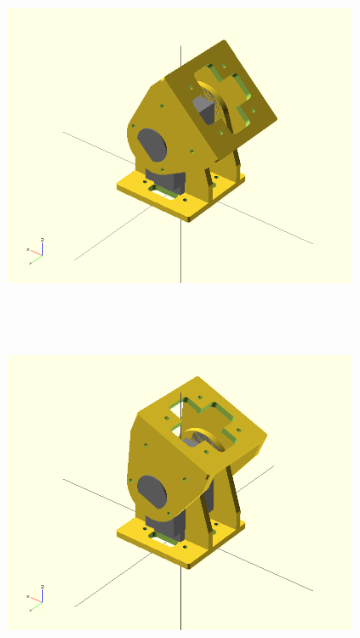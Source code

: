 \begin{figure}[h]
\begin{subfigure}[b]{0.18\textwidth}
        \end{subfigure}
        ~
        \begin{subfigure}[b]{0.18\textwidth}
         	   \centering
                \includegraphics[width=\textwidth]{images/Gait_osc_center_135.png}
                ~
                \label{fig:Gait_osc_center_135}
        \end{subfigure}
        ~
        \begin{subfigure}[b]{0.18\textwidth}
         	   \centering
                \includegraphics[width=\textwidth]{images/Gait_osc_center_112_5.png}
                ~
                \label{fig:Gait_osc_center_112_5-2}

\end{subfigure}
\end{figure}
